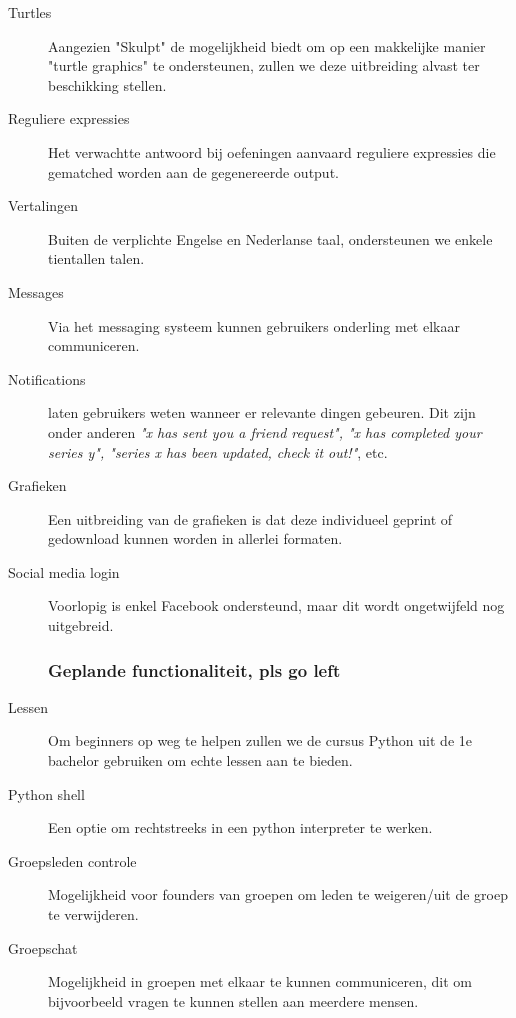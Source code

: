 \begin{description}
\item[Turtles] Aangezien "Skulpt" de mogelijkheid biedt om op een makkelijke manier "turtle graphics" te ondersteunen,
    zullen we deze uitbreiding alvast ter beschikking stellen.

\item[Reguliere expressies] Het verwachtte antwoord bij oefeningen aanvaard reguliere expressies die gematched worden
    aan de gegenereerde output.
\item[Vertalingen] Buiten de verplichte Engelse en Nederlanse taal, ondersteunen we enkele tientallen talen.
\item[Messages] Via het messaging systeem kunnen gebruikers onderling met elkaar communiceren.
\item[Notifications] laten gebruikers weten wanneer er relevante dingen gebeuren. Dit zijn onder anderen
    \textsl{"x has sent you a friend request", "x has completed your series y", "series x has been updated, check it out!"}, etc.
\item[Grafieken] Een uitbreiding van de grafieken is dat deze individueel geprint of gedownload kunnen worden in
    allerlei formaten.
\item[Social media login] Voorlopig is enkel Facebook ondersteund, maar dit wordt ongetwijfeld nog uitgebreid.
\subsubsection{Geplande functionaliteit, pls go left}
\item[Lessen] Om beginners op weg te helpen zullen we de cursus Python uit de 1e bachelor gebruiken om echte lessen
    aan te bieden.
\item[Python shell] Een optie om rechtstreeks in een python interpreter te werken.
\item[Groepsleden controle] Mogelijkheid voor founders van groepen om leden te weigeren/uit de groep te verwijderen.
\item[Groepschat] Mogelijkheid in groepen met elkaar te kunnen communiceren, dit om bijvoorbeeld vragen te kunnen
    stellen aan meerdere mensen.
\end{description}
